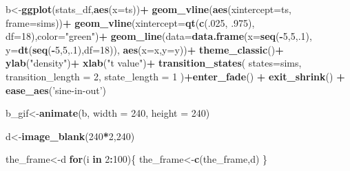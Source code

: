 \documentclass[]{book}
\newenvironment{Shaded}{\begin{snugshade}}{\end{snugshade}}
\newcommand{\ControlFlowTok}[1]{\textcolor[rgb]{0.13,0.29,0.53}{\textbf{#1}}}
\newcommand{\DataTypeTok}[1]{\textcolor[rgb]{0.13,0.29,0.53}{#1}}
\newcommand{\DecValTok}[1]{\textcolor[rgb]{0.00,0.00,0.81}{#1}}
\newcommand{\FloatTok}[1]{\textcolor[rgb]{0.00,0.00,0.81}{#1}}
\newcommand{\KeywordTok}[1]{\textcolor[rgb]{0.13,0.29,0.53}{\textbf{#1}}}
\newcommand{\NormalTok}[1]{#1}
\newcommand{\OperatorTok}[1]{\textcolor[rgb]{0.81,0.36,0.00}{\textbf{#1}}}
\newcommand{\StringTok}[1]{\textcolor[rgb]{0.31,0.60,0.02}{#1}}
\begin{document}
\begin{Shaded}
\begin{Highlighting}[]
{{{{\NormalTok{b<-}\KeywordTok{ggplot}\NormalTok{(stats_df,}\KeywordTok{aes}\NormalTok{(}\DataTypeTok{x=}\NormalTok{ts))}\OperatorTok{+}
\StringTok{  }\KeywordTok{geom_vline}\NormalTok{(}\KeywordTok{aes}\NormalTok{(}\DataTypeTok{xintercept=}\NormalTok{ts, }\DataTypeTok{frame=}\NormalTok{sims))}\OperatorTok{+}
\StringTok{  }\KeywordTok{geom_vline}\NormalTok{(}\DataTypeTok{xintercept=}\KeywordTok{qt}\NormalTok{(}\KeywordTok{c}\NormalTok{(.}\DecValTok{025}\NormalTok{, }\FloatTok{.975}\NormalTok{), }\DataTypeTok{df=}\DecValTok{18}\NormalTok{),}\DataTypeTok{color=}\StringTok{"green"}\NormalTok{)}\OperatorTok{+}
\StringTok{  }\KeywordTok{geom_line}\NormalTok{(}\DataTypeTok{data=}\KeywordTok{data.frame}\NormalTok{(}\DataTypeTok{x=}\KeywordTok{seq}\NormalTok{(}\OperatorTok{-}\DecValTok{5}\NormalTok{,}\DecValTok{5}\NormalTok{,.}\DecValTok{1}\NormalTok{),}
                            \DataTypeTok{y=}\KeywordTok{dt}\NormalTok{(}\KeywordTok{seq}\NormalTok{(}\OperatorTok{-}\DecValTok{5}\NormalTok{,}\DecValTok{5}\NormalTok{,.}\DecValTok{1}\NormalTok{),}\DataTypeTok{df=}\DecValTok{18}\NormalTok{)),}
            \KeywordTok{aes}\NormalTok{(}\DataTypeTok{x=}\NormalTok{x,}\DataTypeTok{y=}\NormalTok{y))}\OperatorTok{+}
\StringTok{  }\KeywordTok{theme_classic}\NormalTok{()}\OperatorTok{+}
\StringTok{  }\KeywordTok{ylab}\NormalTok{(}\StringTok{"density"}\NormalTok{)}\OperatorTok{+}
\StringTok{  }\KeywordTok{xlab}\NormalTok{(}\StringTok{"t value"}\NormalTok{)}\OperatorTok{+}
\StringTok{  }\KeywordTok{transition_states}\NormalTok{(}
    \DataTypeTok{states=}\NormalTok{sims,}
    \DataTypeTok{transition_length =} \DecValTok{2}\NormalTok{,}
    \DataTypeTok{state_length =} \DecValTok{1}
\NormalTok{  )}\OperatorTok{+}\KeywordTok{enter_fade}\NormalTok{() }\OperatorTok{+}\StringTok{ }
\StringTok{  }\KeywordTok{exit_shrink}\NormalTok{() }\OperatorTok{+}
\StringTok{  }\KeywordTok{ease_aes}\NormalTok{(}\StringTok{'sine-in-out'}\NormalTok{)}

\NormalTok{b_gif<-}\KeywordTok{animate}\NormalTok{(b, }\DataTypeTok{width =} \DecValTok{240}\NormalTok{, }\DataTypeTok{height =} \DecValTok{240}\NormalTok{)}


\NormalTok{d<-}\KeywordTok{image_blank}\NormalTok{(}\DecValTok{240}\OperatorTok{*}\DecValTok{2}\NormalTok{,}\DecValTok{240}\NormalTok{)}

\NormalTok{the_frame<-d}
\ControlFlowTok{for}\NormalTok{(i }\ControlFlowTok{in} \DecValTok{2}\OperatorTok{:}\DecValTok{100}\NormalTok{)\{}
\NormalTok{  the_frame<-}\KeywordTok{c}\NormalTok{(the_frame,d)}
\NormalTok{\}}

}}}}
\end{Highlighting}
\end{Shaded}
\end{document}
